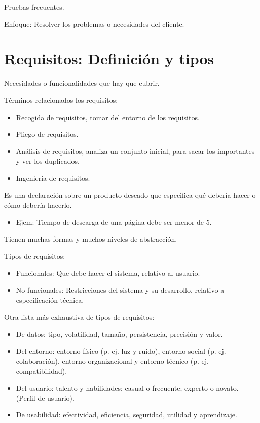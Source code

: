 \documentclass[12pt, twoside, openright]{report} %
\begin{document}
Pruebas frecuentes.

Enfoque: Resolver los problemas o necesidades del cliente.


\section{Requisitos: Definición y tipos}

Necesidades o funcionalidades que hay que cubrir.

Términos relacionados los requisitos:

\begin{itemize}
	\item Recogida de requisitos, tomar del entorno de los requisitos.
	\item Pliego de requisitos.
	\item Análisis de requisitos, analiza un conjunto inicial, para sacar
	      los importantes y ver los duplicados.
	\item Ingeniería de requisitos.
\end{itemize}

Es una declaración sobre un producto deseado que especifica qué
debería hacer o cómo debería hacerlo.

\begin{itemize}
	\item Ejem: Tiempo de descarga de una página debe ser menor de 5.
\end{itemize}

Tienen muchas formas y muchos niveles de abstracción.
\pagebreak

Tipos de requisitos:

\begin{itemize}
	\item Funcionales: Que debe hacer el sistema, relativo al usuario.
	\item No funcionales: Restricciones del sistema y su desarrollo,
	      relativo a especificación técnica.
\end{itemize}

Otra lista más exhaustiva de tipos de requisitos:

\begin{itemize}
	\item De datos: tipo, volatilidad, tamaño, persistencia, precisión y
	      valor.
	\item Del entorno: entorno físico (p. ej. luz y ruido), entorno social
	      (p. ej. colaboración), entorno organizacional y entorno técnico
	      (p. ej. compatibilidad).
	\item Del usuario: talento y habilidades; casual o frecuente; experto o
	      novato. (Perfil de usuario).
	\item De usabilidad: efectividad, eficiencia, seguridad, utilidad y
	      aprendizaje.
\end{itemize}
\end{document}
